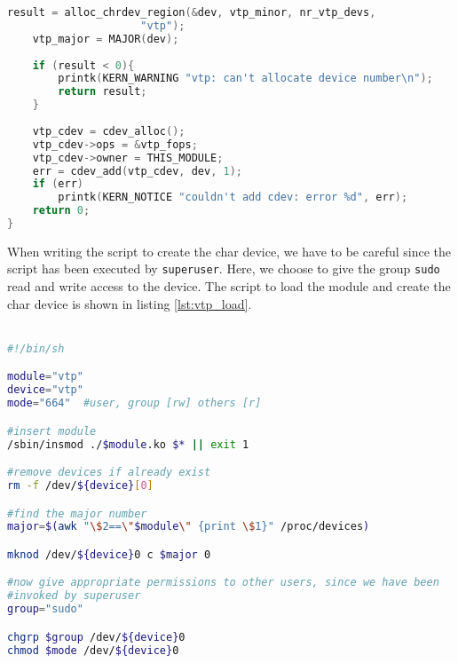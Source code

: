 \documentclass[a4paper,10pt]{article}
\begin{document}
\begin{flushleft}
\begin{lstlisting}[caption={The init function},label={lst:vtp_init},language=C, style=mystyle]
	result = alloc_chrdev_region(&dev, vtp_minor, nr_vtp_devs,
				     "vtp");
	vtp_major = MAJOR(dev);
	
	if (result < 0){
		printk(KERN_WARNING "vtp: can't allocate device number\n");
		return result;
	}
	
	vtp_cdev = cdev_alloc();
	vtp_cdev->ops = &vtp_fops;
	vtp_cdev->owner = THIS_MODULE;
	err = cdev_add(vtp_cdev, dev, 1);
	if (err)
		printk(KERN_NOTICE "couldn't add cdev: error %d", err);
	return 0;
}
\end{lstlisting}

When writing the script to create the char device, we have to be careful since the script has been executed by \verb|superuser|. Here, we
choose to give the group \verb|sudo| read and write access to the device. The script to load the module and create the char device is shown
in listing \ref{lst:vtp_load}. \\~\\

\begin{lstlisting}[caption={The vtp\_load script},label={lst:vtp_load},language=sh, style=mystyle]
#!/bin/sh

module="vtp"
device="vtp"
mode="664"	#user, group [rw] others [r]

#insert module
/sbin/insmod ./$module.ko $* || exit 1

#remove devices if already exist
rm -f /dev/${device}[0]

#find the major number
major=$(awk "\$2==\"$module\" {print \$1}" /proc/devices)

mknod /dev/${device}0 c $major 0

#now give appropriate permissions to other users, since we have been
#invoked by superuser
group="sudo" 

chgrp $group /dev/${device}0
chmod $mode /dev/${device}0
\end{lstlisting}


\end{flushleft}
\end{document}
